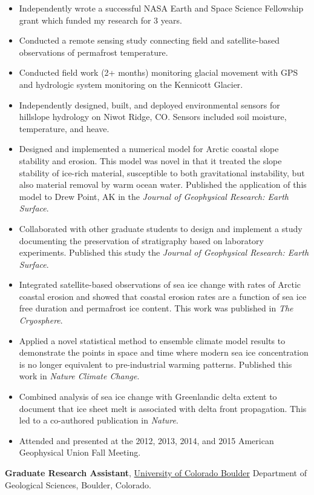 \documentclass[10pt]{article}
\begin{document}
\begin{itemize}
\item Independently wrote a successful NASA Earth and Space Science Fellowship grant which funded my research for 3 years. 
\item Conducted a remote sensing study connecting field and satellite-based observations of permafrost temperature. 
\item Conducted field work (2+ months) monitoring glacial movement with GPS and hydrologic system monitoring on the Kennicott Glacier.
\item Independently designed, built, and deployed environmental sensors for hillslope hydrology on Niwot Ridge, CO. Sensors included soil moisture, temperature, and heave. 
\item Designed and implemented a numerical model for Arctic coastal slope stability and erosion. This model was novel in that it treated the slope stability of ice-rich material, susceptible to both gravitational instability, but also material removal by warm ocean water. Published the application of this model to Drew Point, AK in the \textit{Journal of Geophysical Research: Earth Surface}.
\item Collaborated with other graduate students to design and implement a study documenting the preservation of stratigraphy based on laboratory experiments. Published this study the \textit{Journal of Geophysical Research: Earth Surface}.
\item Integrated satellite-based observations of sea ice change with rates of Arctic coastal erosion and showed that coastal erosion rates are a function of sea ice free duration and permafrost ice content. This work was published in \textit{The Cryosphere}.
\item Applied a novel statistical method to ensemble climate model results to demonstrate the points in space and time where modern sea ice concentration is no longer equivalent to pre-industrial warming patterns. Published this work in \textit{Nature Climate Change}.
\item Combined analysis of sea ice change with Greenlandic delta extent to document that ice sheet melt is associated with delta front propagation. This led to a co-authored publication in \textit{Nature}.
\item Attended and presented at the 2012, 2013, 2014, and 2015 American Geophysical Union Fall Meeting. 
\end{itemize} 

\textbf{Graduate Research Assistant}, \href{http://www.colorado.edu/}{{University of Colorado Boulder}} Department of Geological Sciences, Boulder, Colorado.
\end{document}
